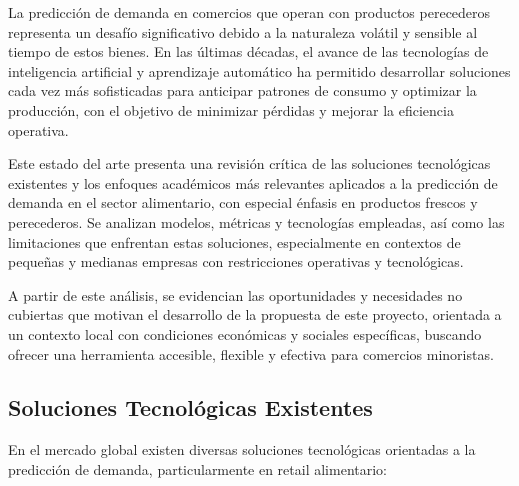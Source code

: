 La predicción de demanda en comercios que operan con productos perecederos representa un desafío significativo debido a la naturaleza volátil y sensible al tiempo de estos bienes. En las últimas décadas, el avance de las tecnologías de inteligencia artificial y aprendizaje automático ha permitido desarrollar soluciones cada vez más sofisticadas para anticipar patrones de consumo y optimizar la producción, con el objetivo de minimizar pérdidas y mejorar la eficiencia operativa.

Este estado del arte presenta una revisión crítica de las soluciones tecnológicas existentes y los enfoques académicos más relevantes aplicados a la predicción de demanda en el sector alimentario, con especial énfasis en productos frescos y perecederos. Se analizan modelos, métricas y tecnologías empleadas, así como las limitaciones que enfrentan estas soluciones, especialmente en contextos de pequeñas y medianas empresas con restricciones operativas y tecnológicas.

A partir de este análisis, se evidencian las oportunidades y necesidades no cubiertas que motivan el desarrollo de la propuesta de este proyecto, orientada a un contexto local con condiciones económicas y sociales específicas, buscando ofrecer una herramienta accesible, flexible y efectiva para comercios minoristas.


\subsection{Soluciones Tecnológicas Existentes}

En el mercado global existen diversas soluciones tecnológicas orientadas a la predicción de demanda, particularmente en retail alimentario:

